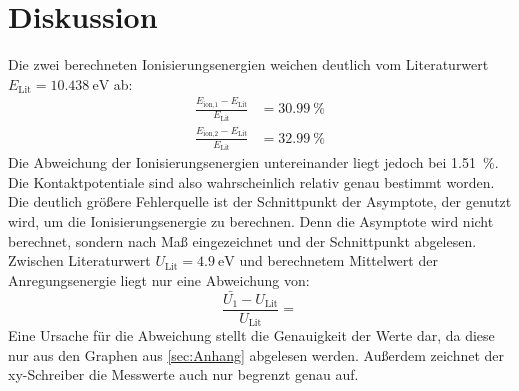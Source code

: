 \section{Diskussion}
\label{sec:Diskussion}

Die zwei berechneten Ionisierungsenergien weichen deutlich vom Literaturwert $E_\text{Lit} = \SI{10.438}{\eV}$ ab:
\begin{align*}
  \frac{E_\text{ion,1} - E_\text{Lit}}{E_\text{Lit}} &= \SI{30.99}{\percent} \\
  \frac{E_\text{ion,2} - E_\text{Lit}}{E_\text{Lit}} &= \SI{32.99}{\percent}
\end{align*}
Die Abweichung der Ionisierungsenergien untereinander liegt jedoch bei \SI{1.51}{\percent}.
Die Kontaktpotentiale sind also wahrscheinlich relativ genau bestimmt worden.
Die deutlich größere Fehlerquelle ist der Schnittpunkt der Asymptote, der genutzt wird, um die Ionisierungsenergie zu berechnen.
Denn die Asymptote wird nicht berechnet, sondern nach Maß eingezeichnet und der Schnittpunkt abgelesen.
Zwischen Literaturwert $U_\text{Lit} = \SI{4.9}{\eV}$ und berechnetem Mittelwert der Anregungsenergie liegt nur eine Abweichung von:
\begin{equation*}
  \frac{\bar{U_1} - U_\text{Lit}}{U_\text{Lit}} =
\end{equation*}
Eine Ursache für die Abweichung stellt die Genauigkeit der Werte dar, da diese nur aus den Graphen aus \ref{sec:Anhang} abgelesen werden.
Außerdem zeichnet der xy-Schreiber die Messwerte auch nur begrenzt genau auf.
